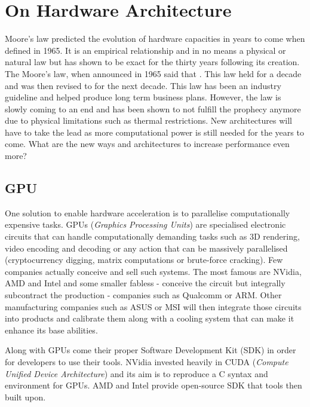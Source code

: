 \section{On Hardware Architecture}

Moore's law \cite{Moore2006} predicted the evolution of hardware capacities in years to come when defined in 1965. It is an empirical relationship and in no means a physical or natural law but has shown to be exact for the thirty years following its creation. The Moore's law, when announced in 1965 said that . This law held for a decade and was then revised to  for the next decade. This law has been an industry guideline and helped produce long term business plans. However, the law is slowly coming to an end and has been shown to not fulfill the prophecy anymore due to physical limitations such as thermal restrictions. New architectures will have to take the lead as more computational power is still needed for the years to come. What are the new ways and architectures to increase performance even more?


\subsection{GPU}

One solution to enable hardware acceleration is to parallelise computationally expensive tasks. GPUs (\emph{Graphics Processing Units}) are specialised electronic circuits that can handle computationally demanding tasks such as 3D rendering, video encoding and decoding or any action that can be massively parallelised (cryptocurrency digging, matrix computations or brute-force cracking). Few companies actually conceive and sell such systems. The most famous are NVidia, AMD and Intel and some smaller fabless - conceive the circuit but integrally subcontract the production -  companies such as Qualcomm or ARM. Other manufacturing companies such as ASUS or MSI will then integrate those circuits into products and calibrate them along with a cooling system that can make it enhance its base abilities.

Along with GPUs come their proper Software Development Kit (SDK) in order for developers to use their tools. NVidia invested heavily in CUDA (\emph{Compute Unified Device Architecture}) \cite{CUDA} and its aim is to reproduce a C syntax and environment for GPUs. AMD and Intel provide open-source SDK that tools then built upon.

